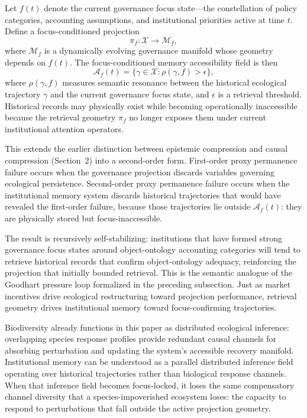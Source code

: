 \documentclass[12pt]{article}
\newcommand{\Xcal}{\mathcal{X}}
\newcommand{\Mcal}{\mathcal{M}}
\newcommand{\Acal}{\mathcal{A}}
\begin{document}
Let $f(t)$ denote the current governance focus state---the constellation of policy
categories, accounting assumptions, and institutional priorities active at time $t$.
Define a focus-conditioned projection
\begin{equation}
\pi_f : \Xcal \to \Mcal_f,
\end{equation}
where $\Mcal_f$ is a dynamically evolving governance manifold whose geometry depends on
$f(t)$. The focus-conditioned memory accessibility field is then
\begin{equation}
\label{eq:access-field}
\Acal_f(t) = \bigl\{\gamma\in\Xcal : \rho(\gamma, f) > \epsilon\bigr\},
\end{equation}
where $\rho(\gamma, f)$ measures semantic resonance between the historical ecological
trajectory $\gamma$ and the current governance focus state, and $\epsilon$ is a
retrieval threshold. Historical records may physically exist while becoming operationally
inaccessible because the retrieval geometry $\pi_f$ no longer exposes them under current
institutional attention operators.

This extends the earlier distinction between epistemic compression and causal compression
(Section~2) into a second-order form. First-order proxy permanence failure occurs when
the governance projection discards variables governing ecological persistence. Second-order
proxy permanence failure occurs when the institutional memory system discards historical
trajectories that would have revealed the first-order failure, because those trajectories
lie outside $\Acal_f(t)$: they are physically stored but focus-inaccessible.

The result is recursively self-stabilizing: institutions that have formed strong
governance focus states around object-ontology accounting categories will tend to
retrieve historical records that confirm object-ontology adequacy, reinforcing the
projection that initially bounded retrieval. This is the semantic analogue of the
Goodhart pressure loop formalized in the preceding subsection. Just as market incentives
drive ecological restructuring toward projection performance, retrieval geometry drives
institutional memory toward focus-confirming trajectories.

Biodiversity already functions in this paper as distributed ecological inference: overlapping
species response profiles provide redundant causal channels for absorbing perturbation
and updating the system's accessible recovery manifold. Institutional memory can be
understood as a parallel distributed inference field operating over historical trajectories
rather than biological response channels. When that inference field becomes focus-locked,
it loses the same compensatory channel diversity that a species-impoverished ecosystem
loses: the capacity to respond to perturbations that fall outside the active projection
geometry.
\end{document}
